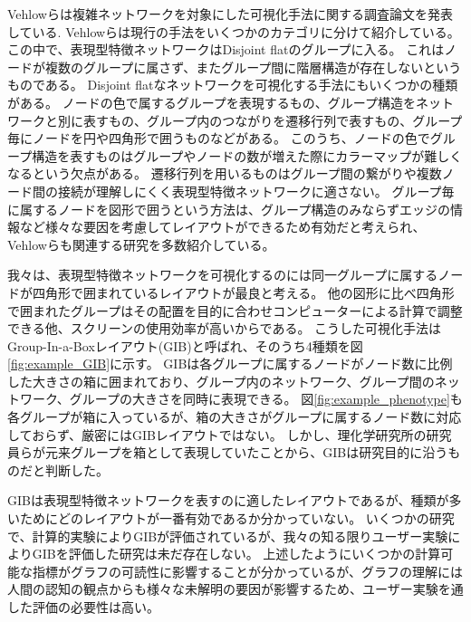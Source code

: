 \documentclass{kuee}
\begin{document}
Vehlowらは複雑ネットワークを対象にした可視化手法に関する調査論文を発表している\cite{Vehlow2017VisualizingGS}.
Vehlowらは現行の手法をいくつかのカテゴリに分けて紹介している。
この中で、表現型特徴ネットワークはDisjoint flatのグループに入る。
これはノードが複数のグループに属さず、またグループ間に階層構造が存在しないというものである。
Disjoint flatなネットワークを可視化する手法にもいくつかの種類がある。
ノードの色で属するグループを表現するもの、グループ構造をネットワークと別に表すもの、グループ内のつながりを遷移行列で表すもの、グループ毎にノードを円や四角形で囲うものなどがある。
このうち、ノードの色でグループ構造を表すものはグループやノードの数が増えた際にカラーマップが難しくなるという欠点がある。
遷移行列を用いるものはグループ間の繋がりや複数ノード間の接続が理解しにくく表現型特徴ネットワークに適さない。
グループ毎に属するノードを図形で囲うという方法は、グループ構造のみならずエッジの情報など様々な要因を考慮してレイアウトができるため有効だと考えられ、Vehlowらも関連する研究を多数紹介している。

我々は、表現型特徴ネットワークを可視化するのには同一グループに属するノードが四角形で囲まれているレイアウトが最良と考える。
他の図形に比べ四角形で囲まれたグループはその配置を目的に合わせコンピューターによる計算で調整できる他、スクリーンの使用効率が高いからである。
こうした可視化手法はGroup-In-a-Boxレイアウト(GIB)と呼ばれ、そのうち4種類を図\ref{fig:example_GIB}に示す。
GIBは各グループに属するノードがノード数に比例した大きさの箱に囲まれており、グループ内のネットワーク、グループ間のネットワーク、グループの大きさを同時に表現できる。
図\ref{fig:example_phenotype}も各グループが箱に入っているが、箱の大きさがグループに属するノード数に対応しておらず、厳密にはGIBレイアウトではない。
しかし、理化学研究所の研究員らが元来グループを箱として表現していたことから、GIBは研究目的に沿うものだと判断した。

GIBは表現型特徴ネットワークを表すのに適したレイアウトであるが、種類が多いためにどのレイアウトが一番有効であるか分かっていない。
いくつかの研究\cite{onoue2017optimal,chaturvedi2014group}で、計算的実験によりGIBが評価されているが、我々の知る限りユーザー実験によりGIBを評価した研究は未だ存在しない。
上述したようにいくつかの計算可能な指標がグラフの可読性に影響することが分かっている\cite{harel2000fast,koren2003drawing,hachul2004drawing,giacomo}が、グラフの理解には人間の認知の観点からも様々な未解明の要因が影響するため、ユーザー実験を通した評価の必要性は高い。
\end{document}
